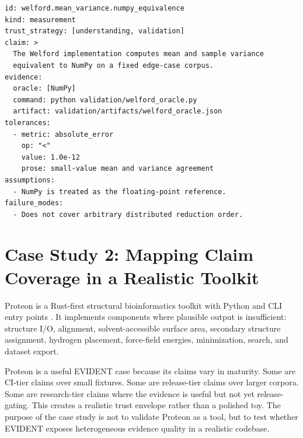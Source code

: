 \documentclass[10pt,twoside]{article}
\begin{document}
\begin{verbatim}
id: welford.mean_variance.numpy_equivalence
kind: measurement
trust_strategy: [understanding, validation]
claim: >
  The Welford implementation computes mean and sample variance
  equivalent to NumPy on a fixed edge-case corpus.
evidence:
  oracle: [NumPy]
  command: python validation/welford_oracle.py
  artifact: validation/artifacts/welford_oracle.json
tolerances:
  - metric: absolute_error
    op: "<"
    value: 1.0e-12
    prose: small-value mean and variance agreement
assumptions:
  - NumPy is treated as the floating-point reference.
failure_modes:
  - Does not cover arbitrary distributed reduction order.
\end{verbatim}

\section{Case Study 2: Mapping Claim Coverage in a Realistic Toolkit}

Proteon is a Rust-first structural bioinformatics toolkit with Python and CLI
entry points \citep{proteon_repo}. It implements components where plausible
output is insufficient: structure I/O, alignment, solvent-accessible surface
area, secondary structure assignment, hydrogen placement, force-field energies,
minimization, search, and dataset export.

Proteon is a useful EVIDENT case because its claims vary in maturity. Some are
CI-tier claims over small fixtures. Some are release-tier claims over larger
corpora. Some are research-tier claims where the evidence is useful but not yet
release-gating. This creates a realistic trust envelope rather than a polished
toy. The purpose of the case study is not to validate Proteon as a tool, but to
test whether EVIDENT exposes heterogeneous evidence quality in a realistic
codebase.
\end{document}
